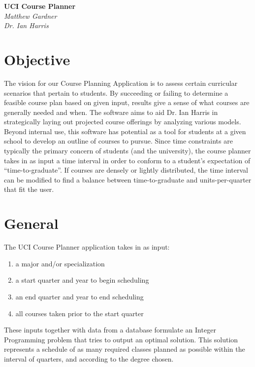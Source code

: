 \documentclass[a4paper,12pt]{article}
\begin{document}
   \begin{center}
      \Large\textbf{UCI Course Planner}\\
      \large\textit{Matthew Gardner\\Dr. Ian Harris}
   \end{center}

\section{Objective}
The vision for our Course Planning Application is to assess certain curricular scenarios that pertain to students. By succeeding or failing to determine a feasible course plan based on given input, results give a sense of what courses are generally needed and when. The software aims to aid Dr. Ian Harris in strategically laying out projected course offerings by analyzing various models. Beyond internal use, this software has potential as a tool for students at a given school to develop an outline of courses to pursue. Since time constraints are typically the primary concern of students (and the university), the course planner takes in as input a time interval in order to conform to a student’s expectation of “time-to-graduate”. If courses are densely or lightly distributed, the time interval can be modified to find a balance between time-to-graduate and units-per-quarter that fit the user.
 
\section{General}
The UCI Course Planner application takes in as input:
\begin{enumerate}
\item
a major and/or specialization
\item
a start quarter and year to begin scheduling
\item
an end quarter and year to end scheduling
\item
all courses taken prior to the start quarter
\end{enumerate}
These inputs together with data from a database formulate an Integer Programming problem that tries to output an optimal solution. This solution represents a schedule of as many required classes planned as possible within the interval of quarters, and according to the degree chosen. 
\end{document}
